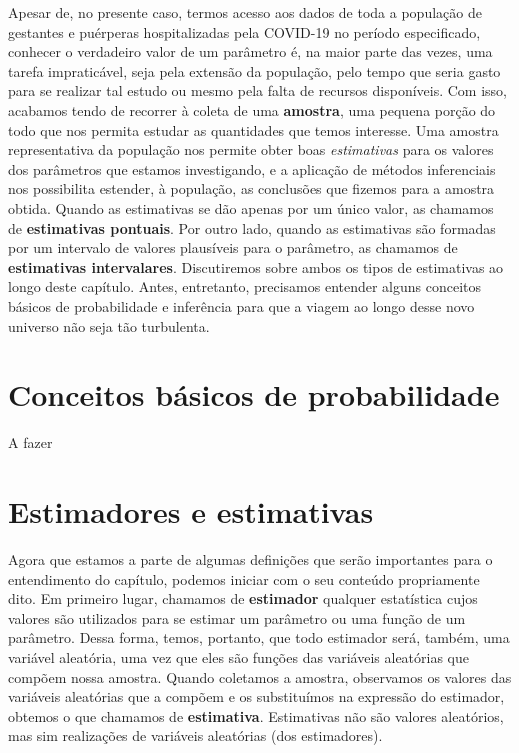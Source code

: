 \documentclass[
  letterpaper,
  DIV=11,
  numbers=noendperiod]{scrreprt}
\begin{document}
Apesar de, no presente caso, termos acesso aos dados de toda a população
de gestantes e puérperas hospitalizadas pela COVID-19 no período
especificado, conhecer o verdadeiro valor de um parâmetro é, na maior
parte das vezes, uma tarefa impraticável, seja pela extensão da
população, pelo tempo que seria gasto para se realizar tal estudo ou
mesmo pela falta de recursos disponíveis. Com isso, acabamos tendo de
recorrer à coleta de uma \textbf{amostra}, uma pequena porção do todo
que nos permita estudar as quantidades que temos interesse. Uma amostra
representativa da população nos permite obter boas \emph{estimativas}
para os valores dos parâmetros que estamos investigando, e a aplicação
de métodos inferenciais nos possibilita estender, à população, as
conclusões que fizemos para a amostra obtida. Quando as estimativas se
dão apenas por um único valor, as chamamos de \textbf{estimativas
pontuais}. Por outro lado, quando as estimativas são formadas por um
intervalo de valores plausíveis para o parâmetro, as chamamos de
\textbf{estimativas intervalares}. Discutiremos sobre ambos os tipos de
estimativas ao longo deste capítulo. Antes, entretanto, precisamos
entender alguns conceitos básicos de probabilidade e inferência para que
a viagem ao longo desse novo universo não seja tão turbulenta.

\hypertarget{conceitos-buxe1sicos-de-probabilidade}{%
\section{Conceitos básicos de
probabilidade}\label{conceitos-buxe1sicos-de-probabilidade}}

A fazer

\hypertarget{estimadores-e-estimativas}{%
\section{Estimadores e estimativas}\label{estimadores-e-estimativas}}

Agora que estamos a parte de algumas definições que serão importantes
para o entendimento do capítulo, podemos iniciar com o seu conteúdo
propriamente dito. Em primeiro lugar, chamamos de \textbf{estimador}
qualquer estatística cujos valores são utilizados para se estimar um
parâmetro ou uma função de um parâmetro. Dessa forma, temos, portanto,
que todo estimador será, também, uma variável aleatória, uma vez que
eles são funções das variáveis aleatórias que compõem nossa amostra.
Quando coletamos a amostra, observamos os valores das variáveis
aleatórias que a compõem e os substituímos na expressão do estimador,
obtemos o que chamamos de \textbf{estimativa}. Estimativas não são
valores aleatórios, mas sim realizações de variáveis aleatórias (dos
estimadores).
\end{document}
